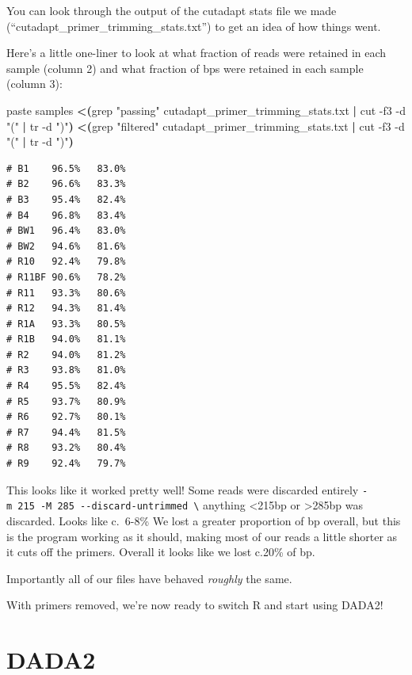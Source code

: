 \documentclass[
]{book}
\newenvironment{Shaded}{\begin{snugshade}}{\end{snugshade}}
\newcommand{\AttributeTok}[1]{\textcolor[rgb]{0.77,0.63,0.00}{#1}}
\newcommand{\ExtensionTok}[1]{#1}
\newcommand{\FunctionTok}[1]{\textcolor[rgb]{0.00,0.00,0.00}{#1}}
\newcommand{\KeywordTok}[1]{\textcolor[rgb]{0.13,0.29,0.53}{\textbf{#1}}}
\newcommand{\NormalTok}[1]{#1}
\newcommand{\OperatorTok}[1]{\textcolor[rgb]{0.81,0.36,0.00}{\textbf{#1}}}
\newcommand{\StringTok}[1]{\textcolor[rgb]{0.31,0.60,0.02}{#1}}
\begin{document}
You can look through the output of the cutadapt stats file we made (``cutadapt\_primer\_trimming\_stats.txt'') to get an idea of how things went.

Here's a little one-liner to look at what fraction of reads were retained in each sample (column 2) and what fraction of bps were retained in each sample (column 3):

\begin{Shaded}
\begin{Highlighting}[]
    \ExtensionTok{paste}\NormalTok{ samples }\OperatorTok{\textless{}(}\FunctionTok{grep} \StringTok{"passing"}\NormalTok{ cutadapt\_primer\_trimming\_stats.txt }\KeywordTok{|} \FunctionTok{cut} \AttributeTok{{-}f3} \AttributeTok{{-}d} \StringTok{"("} \KeywordTok{|} \FunctionTok{tr} \AttributeTok{{-}d} \StringTok{")"}\OperatorTok{)} \OperatorTok{\textless{}(}\FunctionTok{grep} \StringTok{"filtered"}\NormalTok{ cutadapt\_primer\_trimming\_stats.txt }\KeywordTok{|} \FunctionTok{cut} \AttributeTok{{-}f3} \AttributeTok{{-}d} \StringTok{"("} \KeywordTok{|} \FunctionTok{tr} \AttributeTok{{-}d} \StringTok{")"}\OperatorTok{)}
\end{Highlighting}
\end{Shaded}

\begin{verbatim}
# B1    96.5%   83.0%
# B2    96.6%   83.3%
# B3    95.4%   82.4%
# B4    96.8%   83.4%
# BW1   96.4%   83.0%
# BW2   94.6%   81.6%
# R10   92.4%   79.8%
# R11BF 90.6%   78.2%
# R11   93.3%   80.6%
# R12   94.3%   81.4%
# R1A   93.3%   80.5%
# R1B   94.0%   81.1%
# R2    94.0%   81.2%
# R3    93.8%   81.0%
# R4    95.5%   82.4%
# R5    93.7%   80.9%
# R6    92.7%   80.1%
# R7    94.4%   81.5%
# R8    93.2%   80.4%
# R9    92.4%   79.7%
\end{verbatim}

This looks like it worked pretty well!
Some reads were discarded entirely \texttt{-m\ 215\ -M\ 285\ -\/-discard-untrimmed\ \textbackslash{}} anything \textless215bp or \textgreater285bp was discarded. Looks like c.~6-8\%
We lost a greater proportion of bp overall, but this is the program working as it should, making most of our reads a little shorter as it cuts off the primers. Overall it looks like we lost c.20\% of bp.

Importantly all of our files have behaved \emph{roughly} the same.

With primers removed, we're now ready to switch R and start using DADA2!

\hypertarget{dada2}{%
\section{DADA2}\label{dada2}}
\end{document}
